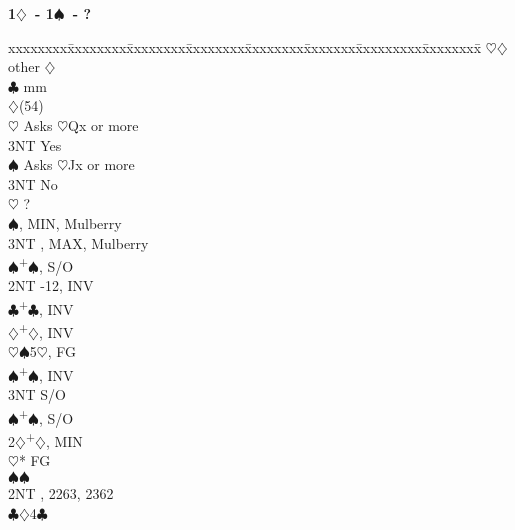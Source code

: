 \documentclass[10pt]{article}
\renewcommand{\c}{$\clubsuit$}
\renewcommand{\d}{$\diamondsuit$}
\newcommand{\h}{$\heartsuit$}
\newcommand{\s}{$\spadesuit$}
\newcommand{\p}{\textsuperscript{+}}
\newenvironment{bidtable}[1][]
{\textbf{#1}
  \begin{adjustwidth}{1em}{}
    \addvspace{2pt}
    \begin{tabbing}
      xxxxxxxx\=xxxxxxxx\=xxxxxxxx\=xxxxxxxx\=xxxxxxxx\=xxxxxxx\=xxxxxxxxx\=xxxxxxxx\=\kill}
{\end{tabbing}\end{adjustwidth}\bigskip}%
\begin{document}
\begin{bidtable}[1\d\ - 1\s\ - ?]
     \>      \>     \>      \h   {}\d                          \\
     \>      \>     \>      \> other \d                          \\
     \>      \c {} mm                                         \\
     \>      \d {}(54)                                        \\
     \>      \>     \h  \> Asks \h Qx or more                    \\
     \>      \>     \>      \> 3NT   \> Yes                          \\
     \>      \>     \s  \> Asks \h Jx or more                    \\
     \>      \>     \>      \> 3NT   \> No                           \\
     \>      \h \> ?                                             \\
     \>      \s {}, MIN, Mulberry                           \\
     \>      \> 3NT , MAX, Mulberry                           \\
     \s  {}\p\s, S/O                                           \\
     \> 2NT  -12, INV                                            \\
     \c  {}\p\c, INV                                           \\
     \d  {}\p\d, INV                                           \\
     \h  {}\s 5\h, FG                                          \\
     \s  {}\p\s, INV                                           \\
     \> 3NT  \> S/O                                                  \\
     \s  {}\p\s, S/O                                           \\
2\d  {}\p\d, MIN                                                   \\
     \h* \> FG                                                   \\
     \>      \s {}\s                                           \\
     \>      \> 2NT , 2263, 2362                              \\
     \>      \c {}\d 4\c                                       \\

\end{bidtable}
\end{document}
